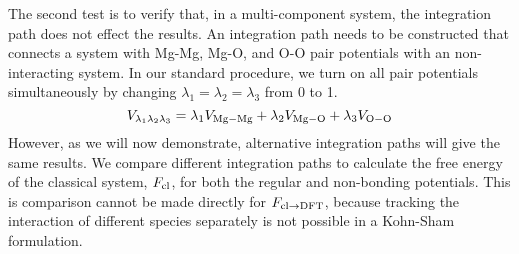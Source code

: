 The second test is to verify that, in a multi-component system, the
integration path does not effect the results. An integration path needs to
be constructed that connects a system with Mg-Mg, Mg-O, and O-O pair
potentials with an non-interacting system. In our standard procedure, we
turn on all pair potentials simultaneously by changing
$\lambda_1=\lambda_2=\lambda_3$ from 0 to 1.
%
\begin{equation}
      V_{\lambda_1\lambda_2\lambda_3} = \lambda_1 V_{\rm Mg-Mg} + \lambda_2 V_{\rm
      Mg-O} + \lambda_3 V_{\rm O-O} 
\end{equation}
%
 However, as we will now demonstrate, alternative integration paths will give the
 same results. We compare different integration paths to calculate the free energy of
 the classical system, $F_{\rm cl}$, for both the regular and non-bonding potentials.
 This is comparison cannot be made directly for $F_{\rm cl \to DFT}$, because
 tracking the interaction of different species separately is not possible in a
 Kohn-Sham formulation.


